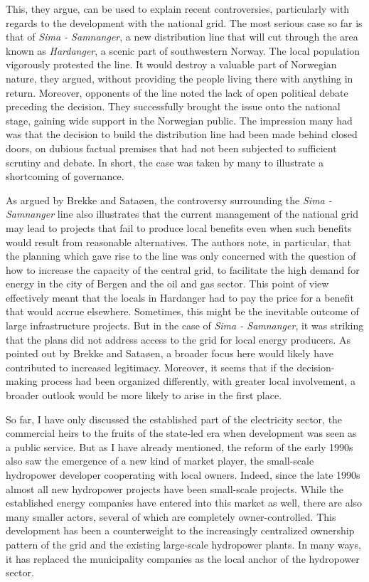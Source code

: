 This, they argue, can be used to explain recent controversies, particularly with regards to the development with the national grid. The most serious case so far is that of {\it Sima - Samnanger}, a new distribution line that will cut through the area known as {\it Hardanger}, a scenic part of southwestern Norway. The local population vigorously protested the line. It would destroy a valuable part of Norwegian nature, they argued, without providing the people living there with anything in return. Moreover, opponents of the line noted the lack of open political debate preceding the decision. They successfully brought the issue onto the national stage, gaining wide support in the Norwegian public. The impression many had was that the decision to build the distribution line had been made behind closed doors, on dubious factual premises that had not been subjected to sufficient scrutiny and debate. In short, the case was taken by many to illustrate a shortcoming of governance.

As argued by Brekke and Sataøen, the controversy surrounding the {\it Sima - Samnanger} line also illustrates that the current management of the national grid may lead to projects that fail to produce local benefits even when such benefits would result from  reasonable alternatives. The authors note, in particular, that the planning which gave rise to the line was only concerned with the question of how to increase the capacity of the central grid, to facilitate the high demand for energy in the city of Bergen and the oil and gas sector. This point of view effectively meant that the locals in Hardanger had to pay the price for a benefit that would accrue elsewhere. Sometimes, this might be the inevitable outcome of large infrastructure projects. But in the case of {\it Sima - Samnanger}, it was striking that the plans did not address access to the grid for local energy producers. As pointed out by Brekke and Sataøen, a broader focus here would likely have contributed to increased legitimacy. Moreover, it seems that if the decision-making process had been organized differently, with greater local involvement, a broader outlook would be more likely to arise in the first place.

So far, I have only discussed the established part of the electricity sector, the commercial heirs to the fruits of the state-led era when development was seen as a public service. But as I have already mentioned, the reform of the early 1990s also saw the emergence of a new kind of market player, the small-scale hydropower developer cooperating with local owners. Indeed, since the late 1990s almost all new hydropower projects have been small-scale projects. While the established energy companies have entered into this market as well, there are also many smaller actors, several of which are completely owner-controlled. This development has been a counterweight to the increasingly centralized ownership pattern of the grid and the existing large-scale hydropower plants. In many ways, it has replaced the municipality companies as the local anchor of the hydropower sector. 

